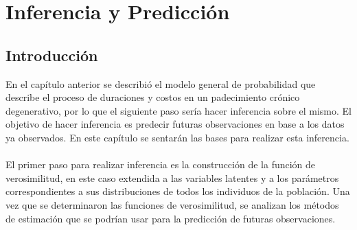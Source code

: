 \chapter{Inferencia y Predicci\'on}
\section{Introducci\'on}
En el cap\'itulo anterior se describi\'o el modelo general de probabilidad que describe el proceso de duraciones y costos en un padecimiento cr\'onico degenerativo, por lo que el siguiente paso ser\'ia hacer inferencia sobre el mismo. El objetivo de hacer inferencia es predecir futuras observaciones en base a los datos ya observados. En este cap\'itulo se sentar\'an las bases para realizar esta inferencia.\\
\\
El primer paso para realizar inferencia es la construcci\'on de la funci\'on de verosimilitud, en este caso extendida a las variables latentes y a los par\'ametros correspondientes a sus distribuciones de todos los individuos de la poblaci\'on. Una vez que se determinaron las funciones de verosimilitud, se analizan los m\'etodos de estimaci\'on que se podr\'ian usar para la predicci\'on de futuras observaciones. %
